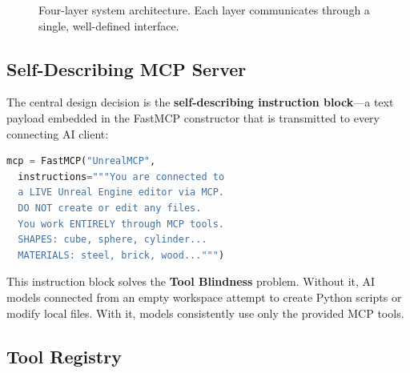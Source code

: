 \documentclass[conference]{IEEEtran}
\begin{document}
\begin{figure}[htbp]
\centering
{}
\caption{Four-layer system architecture. Each layer communicates through a single, well-defined interface.}
\label{fig:architecture}
\end{figure}

\subsection{Self-Describing MCP Server}

The central design decision is the \textbf{self-describing instruction block}---a text payload embedded in the FastMCP constructor that is transmitted to every connecting AI client:

\begin{lstlisting}[language=Python, caption=Self-describing server initialization]
mcp = FastMCP("UnrealMCP",
  instructions="""You are connected to
  a LIVE Unreal Engine editor via MCP.
  DO NOT create or edit any files.
  You work ENTIRELY through MCP tools.
  SHAPES: cube, sphere, cylinder...
  MATERIALS: steel, brick, wood...""")
\end{lstlisting}

This instruction block solves the \textbf{Tool Blindness} problem. Without it, AI models connected from an empty workspace attempt to create Python scripts or modify local files. With it, models consistently use only the provided MCP tools.

\subsection{Tool Registry}
\end{document}
